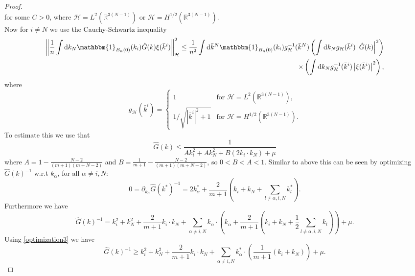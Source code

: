 \documentclass[a4paper,11pt]{article}
\newcommand{\norm}[1]{\left\lVert #1 \right\rVert}
\newcommand{\abs}[1]{\left\lvert #1 \right\rvert}
\newcommand*\diff{\mathop{}\!\mathrm{d}}
\newcommand{\R}{\mathbb{R}}
\numberwithin{equation}{section}
\begin{document}
\begin{proof}
\begin{equation}
	\end{equation}
	for some $ C>0 $, where $ \mathcal{H}=L^2(\R^{3(N-1)}) $ or $  \mathcal{H}=H^{1/2}(\R^{3(N-1)})  $.\\
	Now for $ i\neq N $  we use the Cauchy-Schwartz inequality
	\begin{equation}\label{GxiBound}
	\begin{aligned}
	\norm{\frac{1}{n}\int \diff k_N \mathbbm{1}_{B_n(0)}(k_i)\hat{G}(k)\xi(\bar{k}^i)}^2_{\mathcal{H}}\leq\frac{1}{n^2}\int\diff \bar{k}^N\mathbbm{1}_{B_n(0)}(k_i)g^{-1}_\mathcal{H}(\bar{k}^N)\left(\int \diff k_N g_{\mathcal{H}}(\bar{k}^i)\abs{\hat{G}(k)}^{2}\right)\\\times\left(\int\diff k_N g^{-1}_{\mathcal{H}}(\bar{k}^i)\abs{\xi(\bar{k}^i)}^2\right),
	\end{aligned}
	\end{equation}
	where \begin{equation}
	 g_{\mathcal{H}}(\bar{k}^i)=\begin{cases}
	 1&\text{for }\mathcal{H}=L^2(\R^{3(N-1)}),\\
	 1/\sqrt{\abs{\bar{k}^i}^2+1}&\text{for }\mathcal{H}=H^{1/2}(\R^{3(N-1)}).
	 \end{cases}
	\end{equation}
	To estimate this we use that \begin{equation}\label{Gbound}
	\hat{G}(k)\leq\frac{1}{Ak_i^2+Ak_N^2+B\left(2k_i\cdot k_N\right)+\mu}
	\end{equation}
	where $ A=1-\frac{N-2}{(m+1)(m+N-2)} $ and $ B=\frac{1}{m+1}-\frac{N-2}{(m+1)(m+N-2)} $, so $ 0<B<A<1 $. Similar to above this can be seen by optimizing $ \hat{G}(k)^{-1} $ w.r.t $ k_\alpha $, for all $ \alpha\neq i,N $:
	\begin{equation}\label{optimization3}
	0=\partial_{k_\alpha}\hat{G}(k^*)^{-1}=2k^*_\alpha+\frac{2}{m+1}\left(k_i+k_N+\sum_{l\neq \alpha,i,N}k^*_l\right).
	\end{equation}
	Furthermore we have\begin{equation}\label{optimization4}
	\hat{G}(k)^{-1}=k_i^2+k_N^2+\frac{2}{m+1}k_i\cdot k_N+\sum_{\alpha\neq i,N}k_\alpha\cdot\left(k_\alpha+\frac{2}{m+1}\left(k_i+k_N+\frac{1}{2}\sum_{l\neq\alpha,i,N}k_l\right)\right)+\mu.
	\end{equation}
	Using \eqref{optimization3} we have \begin{equation}\label{optimization5}
	\hat{G}(k)^{-1}\geq k_i^2+k_N^2+\frac{2}{m+1}k_i\cdot k_N+\sum_{\alpha\neq i,N}k^*_\alpha\cdot\left(\frac{1}{m+1}\left(k_i+k_N\right)\right)+\mu.

\end{equation}
\end{proof}
\end{document}
